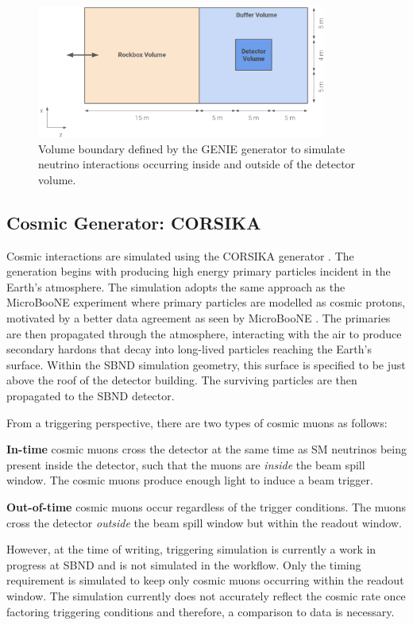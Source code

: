 \begin{figure}[hb!] 
\centering    
\includegraphics[width=0.85\textwidth]{Rockbox_Volume}
\caption[Volume Boundary of the GENIE Generator]{
Volume boundary defined by the GENIE generator to simulate neutrino interactions occurring inside and outside of the detector volume. 
}
\label{fig:Rockbox_Volume}
\end{figure}


\subsection{Cosmic Generator: CORSIKA}
\label{sec:gen_corsika}

Cosmic interactions are simulated using the CORSIKA generator \cite{corsika}.
The generation begins with producing high energy primary particles incident in the Earth's atmosphere.
The simulation adopts the same approach as the MicroBooNE experiment where primary particles are modelled as cosmic protons, motivated by a better data agreement as seen by MicroBooNE \cite{corsika_uboone}.
The primaries are then propagated through the atmosphere, interacting with the air to produce secondary hardons that decay into long-lived particles reaching the Earth's surface.
Within the SBND simulation geometry, this surface is specified to be just above the roof of the detector building.
The surviving particles are then propagated to the SBND detector.

From a triggering perspective, there are two types of cosmic muons as follows:
\begin{coloritemize}
        \item\textbf{In-time} cosmic muons cross the detector at the same time as SM neutrinos being present inside the detector, such that the muons are \textit{inside} the beam spill window. The cosmic muons produce enough light to induce a beam trigger.                            
        \item\textbf{Out-of-time} cosmic muons occur regardless of the trigger conditions. The muons cross the detector \textit{outside} the beam spill window but within the readout window.  
\end{coloritemize}
However, at the time of writing, triggering simulation is currently a work in progress at SBND and is not simulated in the workflow. 
Only the timing requirement is simulated to keep only cosmic muons occurring within the readout window.
The simulation currently does not accurately reflect the cosmic rate once factoring triggering conditions and therefore, a comparison to data is necessary. 


